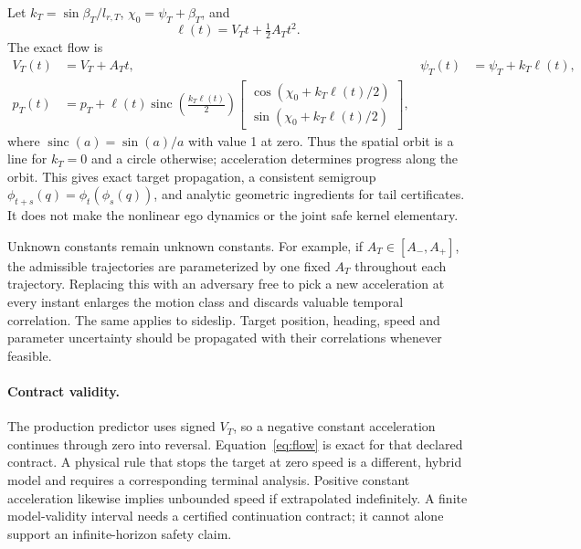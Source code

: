\documentclass[11pt]{article}
\begin{document}
Let $k_T=\sin\beta_T/l_{r,T}$, $\chi_0=\psi_T+\beta_T$, and
\begin{equation}
\ell(t)=V_Tt+\tfrac12 A_Tt^2.
\end{equation}
The exact flow is
\begin{align}
V_T(t)&=V_T+A_Tt, & \psi_T(t)&=\psi_T+k_T\ell(t),\\
p_T(t)&=p_T+\ell(t)\operatorname{sinc}\!\left(\frac{k_T\ell(t)}2\right)
\begin{bmatrix}\cos(\chi_0+k_T\ell(t)/2)\\
                \sin(\chi_0+k_T\ell(t)/2)\end{bmatrix},\label{eq:flow}
\end{align}
where $\operatorname{sinc}(a)=\sin(a)/a$ with value 1 at zero.
Thus the spatial orbit is a line for $k_T=0$ and a circle otherwise;
acceleration determines progress along the orbit. This gives exact target
propagation, a consistent semigroup $\phi_{t+s}(q)=\phi_t(\phi_s(q))$,
and analytic geometric ingredients for tail certificates. It does not
make the nonlinear ego dynamics or the joint safe kernel elementary.

Unknown constants remain unknown constants. For example, if
$A_T\in[A_-,A_+]$, the admissible trajectories are parameterized by one
fixed $A_T$ throughout each trajectory. Replacing this with an adversary
free to pick a new acceleration at every instant enlarges the motion class
and discards valuable temporal correlation. The same applies to sideslip.
Target position, heading, speed and parameter uncertainty should be
propagated with their correlations whenever feasible.

\paragraph{Contract validity.}
The production predictor uses signed $V_T$, so a negative constant
acceleration continues through zero into reversal. Equation~\eqref{eq:flow}
is exact for that declared contract. A physical rule that stops the target
at zero speed is a different, hybrid model and requires a corresponding
terminal analysis. Positive constant acceleration likewise implies
unbounded speed if extrapolated indefinitely. A finite model-validity
interval needs a certified continuation contract; it cannot alone support
an infinite-horizon safety claim.
\end{document}
